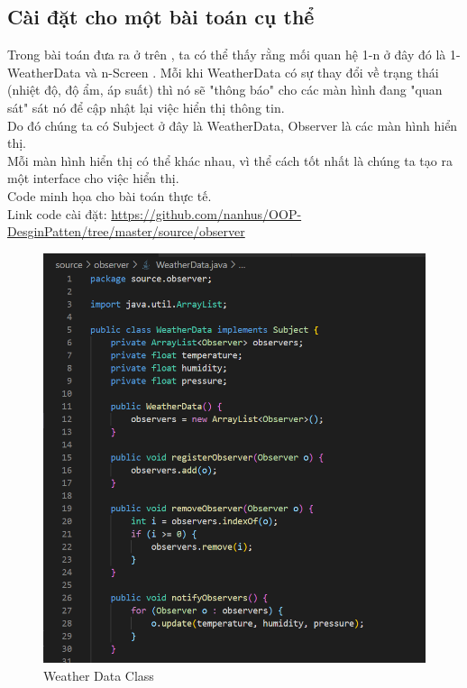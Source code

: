 \subsection{Cài đặt cho một bài toán cụ thể}
Trong bài toán đưa ra ở trên , ta có thể thấy rằng mối quan hệ 1-n ở đây đó là 1-WeatherData và n-Screen . Mỗi khi WeatherData có sự thay đổi về trạng thái (nhiệt độ, độ ẩm, áp suất) thì nó sẽ "thông báo" cho các màn hình đang "quan sát" sát nó để cập nhật lại việc hiển thị thông tin.\\
Do đó chúng ta có Subject ở đây là WeatherData, Observer là các màn hình hiển thị.\\
Mỗi màn hình hiển thị có thể khác nhau, vì thể cách tốt nhất là chúng ta tạo ra một interface cho việc hiển thị.\\
Code minh họa cho bài toán thực tế.\\
Link code cài đặt:
\url{https://github.com/nanhus/OOP-DesginPatten/tree/master/source/observer}
\newpage
\begin{figure}[!htb]
    \centering
    \includegraphics[width=\textwidth]{fig/Observer/weather_data_class.png}
    \caption{Weather Data Class}
    \label{fig:weather_data_class}
\end{figure}
\newpage
